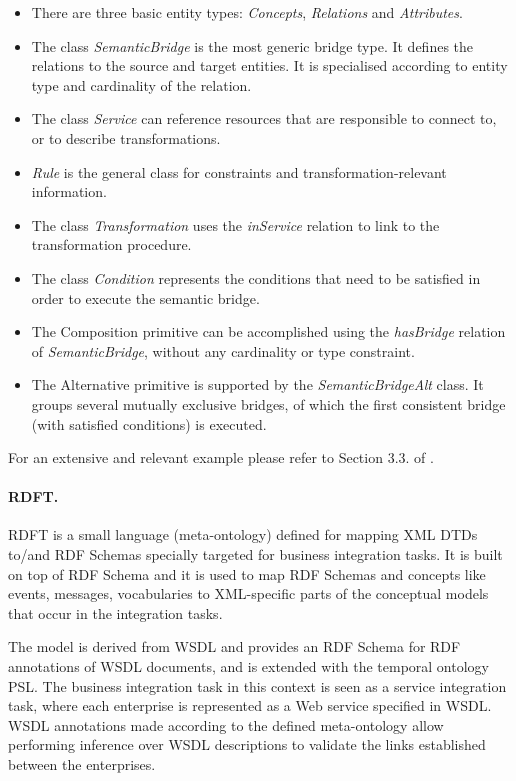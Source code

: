 \begin{itemize}
\item There are three basic entity types: \textit{Concepts},
\textit{Relations} and \textit{Attributes}. 
\item The class \textit{SemanticBridge} is the most generic bridge type.
It defines the relations to the source and target entities. It is
specialised according to entity type and cardinality of the relation. 
\item The class \textit{Service} can reference resources that are
responsible to connect to, or to describe transformations. 
\item \textit{Rule} is the general class for constraints and
transformation-relevant information. 
\item The class \textit{Transformation} uses the \textit{inService}
relation to link to the transformation procedure. 
\item The class \textit{Condition} represents the conditions that need
to be satisfied in order to execute the semantic bridge. 
\item The Composition primitive can be accomplished using the
\textit{hasBridge} relation of \textit{SemanticBridge}, without any
cardinality or type constraint. 
\item The Alternative primitive is supported by the
\textit{SemanticBridgeAlt} class. It groups several mutually exclusive
bridges, of which the first consistent bridge (with satisfied
conditions) is executed. 
\end{itemize}
For an extensive and relevant example please refer to Section 3.3. of
\cite{maedche2002mafra}.

\paragraph{RDFT.}
RDFT \cite{omelayenko2002rdft} is a small language (meta-ontology) defined for
mapping XML DTDs to/and RDF Schemas specially targeted for business
integration tasks. It is built on top of RDF Schema and it is used to
map RDF Schemas and concepts like events, messages, vocabularies to
XML-specific parts of the conceptual models that occur in the
integration tasks. 

The model is derived from WSDL \cite{christensen2001wsdl} and provides
an RDF Schema for RDF annotations of WSDL documents, and is extended
with the temporal ontology PSL. The business integration task in this
context is seen as a service integration task, where each enterprise is
represented as a Web service specified in WSDL. WSDL annotations made
according to the defined meta-ontology allow performing inference over
WSDL descriptions to validate the links established between the
enterprises. 

